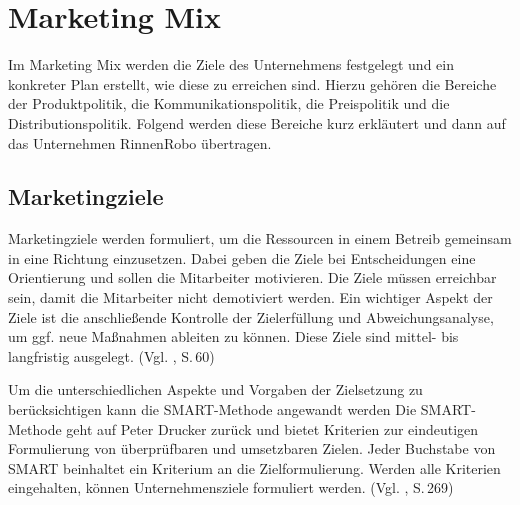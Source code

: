\section{Marketing Mix}
    Im Marketing Mix werden die Ziele des Unternehmens festgelegt und ein konkreter Plan erstellt, wie diese zu 
    erreichen sind. Hierzu gehören die Bereiche der Produktpolitik, die Kommunikationspolitik, die Preispolitik und die
    Distributionspolitik. Folgend werden diese Bereiche kurz erkläutert und dann auf das Unternehmen RinnenRobo 
    übertragen.

\subsection{Marketingziele} \label{mziele}
    Marketingziele werden formuliert, um die Ressourcen in einem Betreib gemeinsam in eine Richtung einzusetzen. Dabei
    geben die Ziele bei Entscheidungen eine Orientierung und sollen die Mitarbeiter motivieren. Die Ziele müssen
    erreichbar sein, damit die Mitarbeiter nicht demotiviert werden. Ein wichtiger Aspekt der Ziele ist die
    anschließende Kontrolle der Zielerfüllung und Abweichungsanalyse, um ggf. neue Maßnahmen ableiten zu können. Diese
    Ziele sind mittel- bis langfristig ausgelegt. (Vgl. \cite{Becker2018}, S.\,60)

    \noindent
    Um die unterschiedlichen Aspekte und Vorgaben der Zielsetzung zu berücksichtigen kann die SMART-Methode angewandt
    werden Die SMART-Methode geht auf Peter Drucker zurück und bietet Kriterien zur eindeutigen Formulierung von
    überprüfbaren und umsetzbaren Zielen. Jeder Buchstabe von SMART beinhaltet ein Kriterium an die Zielformulierung.
    Werden alle Kriterien eingehalten, können Unternehmensziele formuliert werden. (Vgl. \cite{Lawlor2012}, S.\,269)

